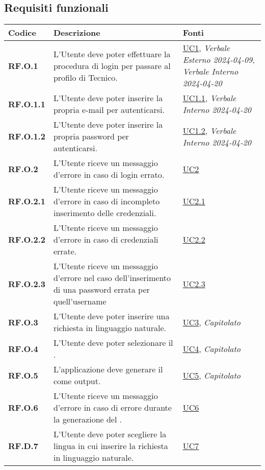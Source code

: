 \subsection{Requisiti funzionali}
\begin{longtable}{|P{3cm}|P{6,5cm}|>{\arraybackslash}P{4cm}|}
    \hline
    \textbf{Codice} & \textbf{Descrizione} & \textbf{Fonti} \\
    \hline
    \textbf{RF.O.1} & L’Utente deve poter effettuare la procedura di login per passare al profilo di Tecnico. &  \hyperref[UC1]{UC1}, \emph{Verbale Esterno 2024-04-09}, \emph{Verbale Interno 2024-04-20}\\
    \hline
    \textbf{RF.O.1.1} & L’Utente deve poter inserire la propria e-mail per autenticarsi. & \hyperref[UC1point1]{UC1.1}, \emph{Verbale Interno 2024-04-20}\\
    \hline
    \textbf{RF.O.1.2} & L’Utente deve poter inserire la propria password per autenticarsi. & \hyperref[UC1point2]{UC1.2}, \emph{Verbale Interno 2024-04-20}\\
    \hline
    \textbf{RF.O.2} & L'Utente riceve un messaggio d'errore in caso di login errato. &  \hyperref[UC2]{UC2}\\
    \hline
    \textbf{RF.O.2.1} & L'Utente  riceve un messaggio d'errore in caso di incompleto inserimento delle credenziali. & \hyperref[UC2point1]{UC2.1}\\
    \hline
    \textbf{RF.O.2.2} & L’Utente  riceve un messaggio d'errore in caso di credenziali errate. & \hyperref[UC2point2]{UC2.2}\\
    \hline
    \textbf{RF.O.2.3} & L’Utente  riceve un messaggio d'errore nel caso dell'inserimento di una password errata per quell'username & \hyperref[UC2point3]{UC2.3}\\
    \hline
    \textbf{RF.O.3} & L’Utente  deve poter inserire una richiesta in linguaggio naturale. &  \hyperref[UC3]{UC3}, \emph{Capitolato}\\
    \hline
    \textbf{RF.O.4} & L’Utente  deve poter selezionare il . &  \hyperref[UC4]{UC4}, \emph{Capitolato}\\
    \hline
    \textbf{RF.O.5} & L'applicazione deve generare il  come output. &  \hyperref[UC5]{UC5}, \emph{Capitolato}\\
    \hline
    \textbf{RF.O.6} & L’Utente  riceve un messaggio d'errore in caso di errore durante la generazione del . &  \hyperref[UC6]{UC6}\\
    \hline
    \textbf{RF.D.7} & L’Utente  deve poter scegliere la lingua in cui inserire la richiesta in linguaggio naturale. &  \hyperref[UC7]{UC7}\\

\end{longtable}
